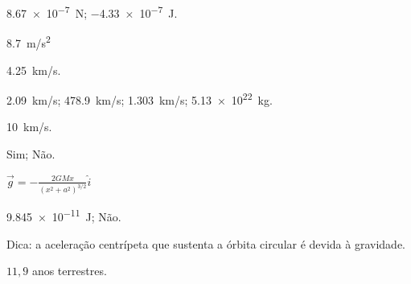 \documentclass[a4paper]{article}
\begin{document}
\begin{respostas}
  \begin{exercicio}
    \begin{inlineenum}%
      \inlineitem \SI{8.67e-7}{N};
      \inlineitem \SI{-4.33e-7}{J}.
    \end{inlineenum}
  \end{exercicio}
  
  \begin{exercicio*}
    \SI{8.7}{m/s^2}
  \end{exercicio*}
  
  \begin{exercicio}
   \SI{4.25}{km/s}.
  \end{exercicio}
  
  \begin{exercicio}
    \begin{inlineenum}%
    \inlineitem \SI{2.09}{km/s};
    \inlineitem \SI{478.9}{km/s};
    \inlineitem \SI{1.303}{km/s};
    \inlineitem \SI{5.13e22}{kg}.
    \end{inlineenum}
  \end{exercicio}

  \begin{exercicio}
   \SI{10}{km/s}.
  \end{exercicio}
  
  \begin{exercicio}
    \begin{inlineenum}%
      \inlineitem Sim;
      \inlineitem Não.
    \end{inlineenum}
  \end{exercicio}
  
  \begin{exercicio}
   $\vec g = -\frac{2GMx}{\left(x^2 + a^2\right)^{3/2}}\hat i$
  \end{exercicio}
  
  \begin{exercicio}
    \begin{inlineenum}%
      \inlineitem \SI{9.845e-11}{J};
      \inlineitem Não.
    \end{inlineenum}
  \end{exercicio}
  
  \begin{exercicio}
   Dica: a aceleração centrípeta que sustenta a órbita circular é devida à gravidade.
  \end{exercicio}
  
  \begin{exercicio}
   $11,9$ anos terrestres.
  \end{exercicio}
  

\end{respostas}
\end{document}
